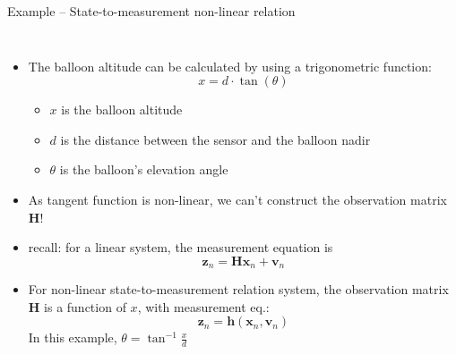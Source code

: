 \begin{frame}{Example – State-to-measurement non-linear relation}
\begin{columns}
        \begin{itemize}
            \item The balloon altitude can be calculated by using a trigonometric function:
            \begin{equation*}
            x = d \cdot \tan(\theta)
            \end{equation*}
            \vspace{-10pt}
            \begin{itemize}
                \item $x$ is the balloon altitude
                \item $d$ is the distance between the sensor and the balloon nadir
                \item $\theta$ is the balloon's elevation angle
            \end{itemize}

        \item As tangent function is non-linear, we can’t construct the observation matrix $\mathbf{H}$!
        \item recall: for a linear system, the measurement equation is
        \[
        \mathbf{z}_n = \mathbf{H} \mathbf{x}_n + \mathbf{v}_n
        \]
        \item For non-linear state-to-measurement relation system, the observation matrix $\mathbf{H}$ is a function of $x$, with measurement eq.:
        \[
        \mathbf{z}_n = \mathbf{h}(\mathbf{x}_n, \mathbf{v}_n)  
        \]
        In this example, $\theta = \tan^{-1}\frac{x}{d}$
        \end{itemize}
            
\end{columns}
\end{frame}

